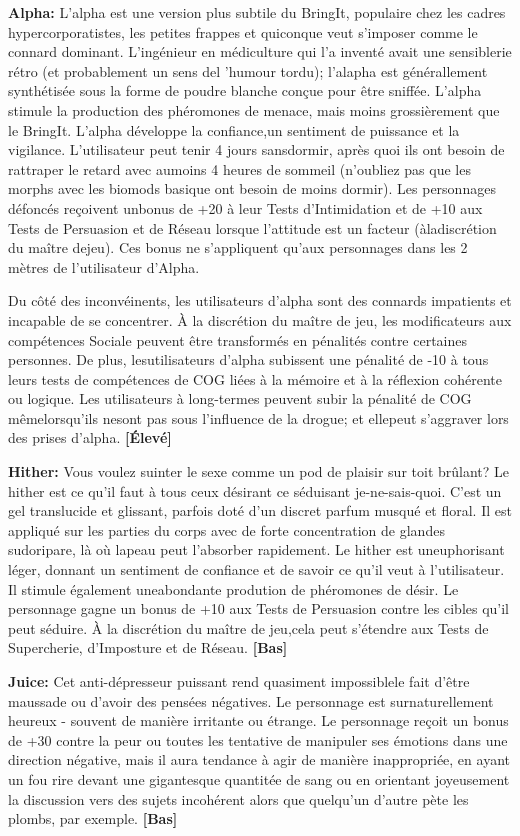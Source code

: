 \textbf{Alpha:} L'alpha est une version plus subtile du BringIt, populaire chez les cadres hypercorporatistes, les petites frappes et quiconque veut s'imposer comme le connard dominant. L'ingénieur en médiculture qui l'a inventé avait une sensiblerie rétro (et probablement un sens del 'humour tordu); l'alapha est générallement synthétisée sous la forme de poudre blanche conçue pour être sniffée.  L'alpha stimule la production des phéromones de menace, mais moins grossièrement que le BringIt. L'alpha développe la confiance,un sentiment de puissance et la vigilance. L'utilisateur peut tenir 4 jours sansdormir, après quoi ils ont besoin de rattraper le retard avec aumoins 4 heures  de sommeil (n'oubliez pas que les morphs avec les biomods basique ont besoin de moins dormir). Les personnages défoncés reçoivent unbonus de +20 à leur Tests d'Intimidation et de +10 aux Tests de Persuasion et de Réseau lorsque l'attitude est un facteur (àladiscrétion du maître dejeu). Ces bonus ne s'appliquent qu'aux personnages dans les 2 mètres de l'utilisateur d'Alpha. 

Du côté des inconvéinents, les utilisateurs d'alpha sont des connards impatients et incapable de se concentrer. À la discrétion du maître de jeu, les modificateurs aux compétences Sociale peuvent être transformés en pénalités contre certaines personnes. De plus, lesutilisateurs d'alpha subissent une pénalité de -10 à tous leurs tests de compétences de COG liées à la mémoire et à la réflexion cohérente ou logique. Les utilisateurs à long-termes peuvent subir la pénalité de COG mêmelorsqu'ils nesont pas sous l'influence de la drogue; et ellepeut s'aggraver lors des prises d'alpha. \textbf{[Élevé]} 

\textbf{Hither:} Vous voulez suinter le sexe comme un pod de plaisir sur toit brûlant? Le hither est ce qu'il faut à tous ceux désirant ce séduisant je-ne-sais-quoi. C'est un gel translucide et glissant, parfois doté d'un discret parfum musqué et floral. Il est appliqué sur les parties du corps avec de forte concentration de glandes sudoripare, là où lapeau peut l'absorber rapidement. Le hither est uneuphorisant léger, donnant un sentiment de confiance et de savoir ce qu'il veut à l'utilisateur. Il stimule également uneabondante prodution de phéromones de désir. Le personnage gagne un bonus de +10 aux Tests de Persuasion contre les cibles qu'il peut séduire. À la discrétion du maître de jeu,cela peut s'étendre aux Tests de Supercherie, d'Imposture et de Réseau. \textbf{[Bas]} 

\textbf{Juice:} Cet anti-dépresseur puissant rend quasiment impossiblele fait d'être maussade ou d'avoir des pensées négatives. Le personnage est surnaturellement heureux - souvent de manière irritante ou étrange. Le personnage reçoit un bonus de +30 contre la peur ou toutes les tentative de manipuler ses émotions dans une direction négative, mais il aura tendance à agir de manière inappropriée, en ayant un fou rire devant une gigantesque quantitée de sang ou en orientant joyeusement  la discussion vers des sujets incohérent alors que quelqu'un d'autre pète les plombs, par exemple. \textbf{[Bas]} 


